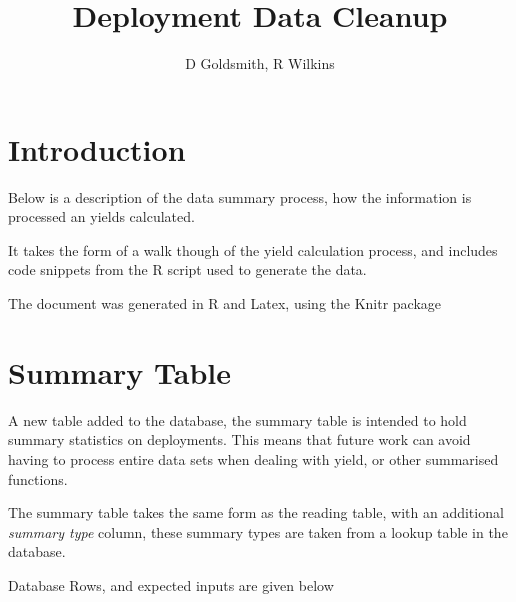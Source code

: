 \documentclass[10pt,a4paper]{article}\usepackage{graphicx, color}
\title{Deployment Data Cleanup}
\author{D Goldsmith, R Wilkins}
\begin{document}
\maketitle

\section{Introduction}

Below is a description of the data summary process, how the information is
processed an yields calculated.

It takes the form of a walk though of the yield calculation process, and
includes code snippets from the R script used to generate the data.

The document was generated in R and Latex, using the Knitr package


\section{Summary Table}
A new table added to the database, the summary table is intended to hold summary
statistics on deployments.  This means that future work can avoid having to
process entire data sets when dealing with yield, or other summarised functions.  

The summary table takes the same form as the reading table, with an additional
\emph{summary type} column,  these summary types are taken from a lookup
table in the database.

Database Rows, and expected inputs are given below
\end{document}
